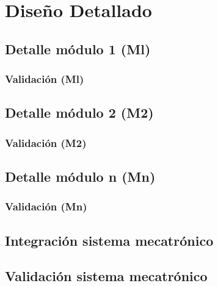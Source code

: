 \section{Diseño Detallado}

\subsection{Detalle módulo 1 (M{l})}

\subsubsection{Validación (M{l})}

\subsection{Detalle módulo 2 (M{2})}

\subsubsection{Validación (M{2})}


\subsection{Detalle módulo n (M{n})}

\subsubsection{Validación (M{n})}

\subsection{Integración sistema mecatrónico}

\subsection{Validación sistema mecatrónico}



\endinput 